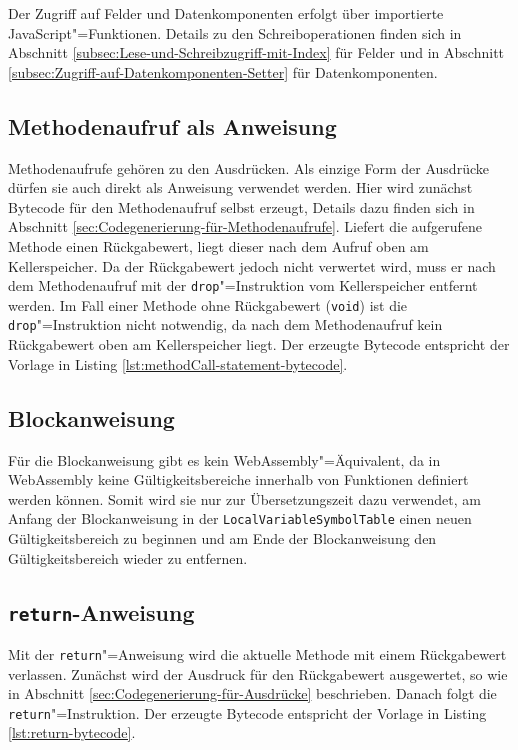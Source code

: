 \pagebreak


Der Zugriff auf Felder und Datenkomponenten erfolgt über importierte JavaScript"=Funktionen. Details zu den Schreiboperationen finden sich in Abschnitt \ref{subsec:Lese-und-Schreibzugriff-mit-Index} für Felder und in Abschnitt \ref{subsec:Zugriff-auf-Datenkomponenten-Setter} für Datenkomponenten.

\subsection{Methodenaufruf als Anweisung}
Methodenaufrufe gehören zu den Ausdrücken. Als einzige Form der Ausdrücke dürfen sie auch direkt als Anweisung verwendet werden. Hier wird zunächst Bytecode für den Methodenaufruf selbst erzeugt, Details dazu finden sich in Abschnitt \ref{sec:Codegenerierung-für-Methodenaufrufe}. Liefert die aufgerufene Methode einen Rückgabewert, liegt dieser nach dem Aufruf oben am Kellerspeicher. Da der Rückgabewert jedoch nicht verwertet wird, muss er nach dem Methodenaufruf mit der \lstinline{drop}"=Instruktion vom Kellerspeicher entfernt werden. Im Fall einer Methode ohne Rückgabewert (\lstinline{void}) ist die \lstinline{drop}"=Instruktion nicht notwendig, da nach dem Methodenaufruf kein Rückgabewert oben am Kellerspeicher liegt. Der erzeugte Bytecode entspricht der Vorlage in Listing \ref{lst:methodCall-statement-bytecode}.



\subsection{Blockanweisung}
Für die Blockanweisung gibt es kein WebAssembly"=Äquivalent, da in WebAssembly keine Gültigkeitsbereiche innerhalb von Funktionen definiert werden können. Somit wird sie nur zur Übersetzungszeit dazu verwendet, am Anfang der Blockanweisung in der \lstinline{LocalVariableSymbolTable} einen neuen Gültigkeitsbereich zu beginnen und am Ende der Blockanweisung den Gültigkeitsbereich wieder zu entfernen.

\subsection{\lstinline{return}-Anweisung}
Mit der \lstinline{return}"=Anweisung wird die aktuelle Methode mit einem Rückgabewert verlassen. Zunächst wird der Ausdruck für den Rückgabewert ausgewertet, so wie in Abschnitt \ref{sec:Codegenerierung-für-Ausdrücke} beschrieben. Danach folgt die \lstinline{return}"=Instruktion. Der erzeugte Bytecode entspricht der Vorlage in Listing \ref{lst:return-bytecode}.

